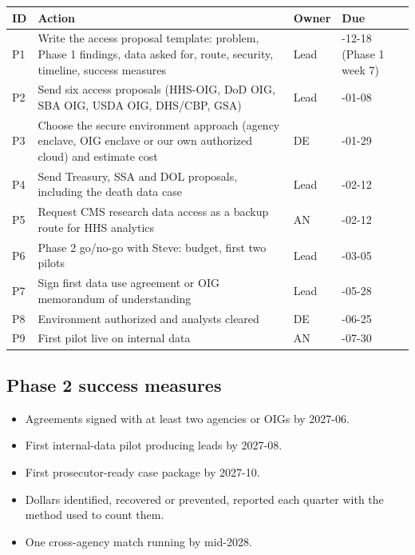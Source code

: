\documentclass[letterpaper,11pt]{article}
\providecommand{\tightlist}{\setlength{\itemsep}{0pt}\setlength{\parskip}{0pt}}
\begin{document}
\begingroup\small\setlength{\tabcolsep}{4pt}\renewcommand{\arraystretch}{1.25}
\begin{longtable}[l]{@{}l>{\raggedright\arraybackslash}p{}l>{\raggedright\arraybackslash}p{}@{}}
\rowcolor{coolblack}\leavevmode\color{white}\bfseries ID & \leavevmode\color{white}\bfseries Action & \leavevmode\color{white}\bfseries Owner & \leavevmode\color{white}\bfseries Due \\
\endhead
P1 & Write the access proposal template: problem, Phase 1 findings, data asked for, route, security, timeline, success measures & Lead & 2026-12-18 (Phase 1 week 7) \\
P2 & Send six access proposals (HHS-OIG, DoD OIG, SBA OIG, USDA OIG, DHS/CBP, GSA) & Lead & 2027-01-08 \\
P3 & Choose the secure environment approach (agency enclave, OIG enclave or our own authorized cloud) and estimate cost & DE & 2027-01-29 \\
P4 & Send Treasury, SSA and DOL proposals, including the death data case & Lead & 2027-02-12 \\
P5 & Request CMS research data access as a backup route for HHS analytics & AN & 2027-02-12 \\
P6 & Phase 2 go/no-go with Steve: budget, first two pilots & Lead & 2027-03-05 \\
P7 & Sign first data use agreement or OIG memorandum of understanding & Lead & 2027-05-28 \\
P8 & Environment authorized and analysts cleared & DE & 2027-06-25 \\
P9 & First pilot live on internal data & AN & 2027-07-30 \\
\end{longtable}\endgroup

\hypertarget{phase-2-success-measures}{%
\subsection{Phase 2 success measures}\label{phase-2-success-measures}}

\begin{itemize}
\tightlist
\item
  Agreements signed with at least two agencies or OIGs by 2027-06.
\item
  First internal-data pilot producing leads by 2027-08.
\item
  First prosecutor-ready case package by 2027-10.
\item
  Dollars identified, recovered or prevented, reported each quarter with
  the method used to count them.
\item
  One cross-agency match running by mid-2028.
\end{itemize}
\end{document}
